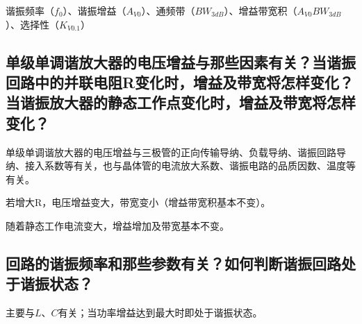 \documentclass{../source/Experiment}
\begin{document}
谐振频率（$f_0$）、谐振增益（$A_{V0}$）、通频带（$BW_{3dB}$）、增益带宽积（$A_{V0}BW_{3dB}$）、选择性（$K_{V0.1}$）

\subsection{单级单调谐放大器的电压增益与那些因素有关？当谐振回路中的并联电阻R变化时，增益及带宽将怎样变化？当谐振放大器的静态工作点变化时，增益及带宽将怎样变化？}

单级单调谐放大器的电压增益与三极管的正向传输导纳、负载导纳、谐振回路导纳、接入系数等有关，也与晶体管的电流放大系数、谐振电路的品质因数、温度等有关。

若增大R，电压增益变大，带宽变小（增益带宽积基本不变）。

随着静态工作电流变大，增益增加及带宽基本不变。

\subsection{回路的谐振频率和那些参数有关？如何判断谐振回路处于谐振状态？}

主要与$L$、$C$有关；当功率增益达到最大时即处于谐振状态。
\end{document}
